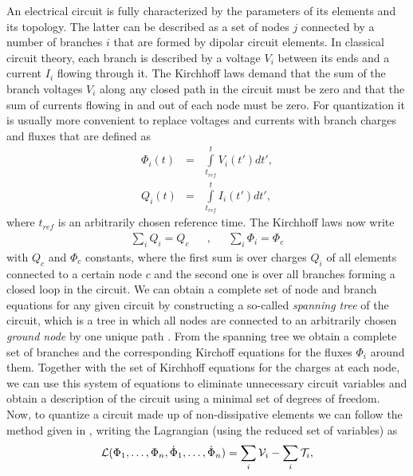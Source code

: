 An electrical circuit is fully characterized by the parameters of its elements and its topology. The latter can be described as a set of nodes $j$ connected by a number of branches $i$ that are formed by dipolar circuit elements. In classical circuit theory, each branch is described by a voltage $V_i$ between its ends and a current $I_{i}$ flowing through it. The Kirchhoff laws demand that the sum of the branch voltages $V_i$ along any closed path in the circuit must be zero and that the sum of currents flowing in and out of each node must be zero. For quantization it is usually more convenient to replace voltages and currents with branch charges and fluxes that are defined as
%
\begin{eqnarray}
\Phi_i(t) & = & \int\limits_{t_{ref}}^t V_i(t') dt',\\
Q_i(t) & = & \int\limits_{t_{ref}}^t I_i(t') dt',
\end{eqnarray}
%
where $t_{ref}$ is an arbitrarily chosen reference time. The Kirchhoff laws now write
%
\begin{align}
\sum\limits_{i} Q_i  =  Q_c & & , & & \sum\limits_{i}\Phi_i = \Phi_c \label{eq:kirchhoff_charge}
\end{align}
%
with $Q_c$ and $\Phi_c$ constants, where the first sum is over charges $Q_i$ of all elements connected to a certain node $c$ and the second one is over all branches forming a closed loop in the circuit. We can obtain a complete set of node and branch equations for any given circuit by constructing a so-called {\it spanning tree} of the circuit, which is a tree in which all nodes are connected to an arbitrarily chosen {\it ground node} by one unique path \citep{devoret_quantum_1995}. From the spanning tree we obtain a complete set of branches and the corresponding Kirchoff equations for the fluxes $\Phi_i$ around them. Together with the set of Kirchhoff equations for the charges at each node, we can use this system of equations to eliminate unnecessary circuit variables and obtain a description of the circuit using a minimal set of degrees of freedom. Now, to quantize a circuit made up of non-dissipative elements we can follow the method given in \cite{yurke_quantum_1984}, writing the Lagrangian (using the reduced set of variables) as 
%
\begin{equation}
\begin{mathcal}L\end{mathcal}(\Phi_1,\hdots,\Phi_n,\dot{\Phi}_1,\hdots,\dot{\Phi}_n) = \sum\limits_i \begin{mathcal}V\end{mathcal}_i - \sum\limits_i \begin{mathcal}T\end{mathcal}_i \label{eq:circuit_lagrangian},
\end{equation}
